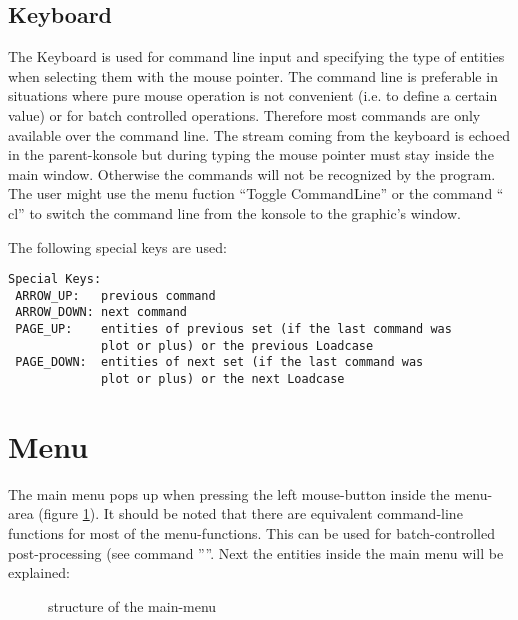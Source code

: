 \documentclass{article}
\begin{document}
\subsection{\label{Keyboard}Keyboard}
The Keyboard is used for command line input and specifying the type of entities when selecting them with the mouse pointer. The command line is preferable in situations where pure mouse operation is not convenient (i.e. to define a certain value) or for batch controlled operations. Therefore most commands are only available over the command line. The stream coming from the keyboard is echoed in the parent-konsole but during typing the mouse pointer must stay inside the main window. Otherwise the commands will not be recognized by the program. The user might use the menu fuction ``Toggle CommandLine'' or the command `` cl'' to switch the command line from the konsole to the graphic's window.

The following special keys are used:
\begin{verbatim}
Special Keys:
 ARROW_UP:   previous command
 ARROW_DOWN: next command
 PAGE_UP:    entities of previous set (if the last command was
             plot or plus) or the previous Loadcase
 PAGE_DOWN:  entities of next set (if the last command was 
             plot or plus) or the next Loadcase
\end{verbatim}



\section{\label{Menu}Menu}
The main menu pops up when pressing the left mouse-button inside the menu-area (figure \ref{mainmenu}). It should be noted that there are equivalent command-line functions for most of the menu-functions. This can be used for batch-controlled post-processing (see command ''''. Next the entities inside the main menu will be explained:
  
\begin{figure}[h]
\caption{\label{mainmenu}structure of the main-menu}
\end{figure}
\end{document}
